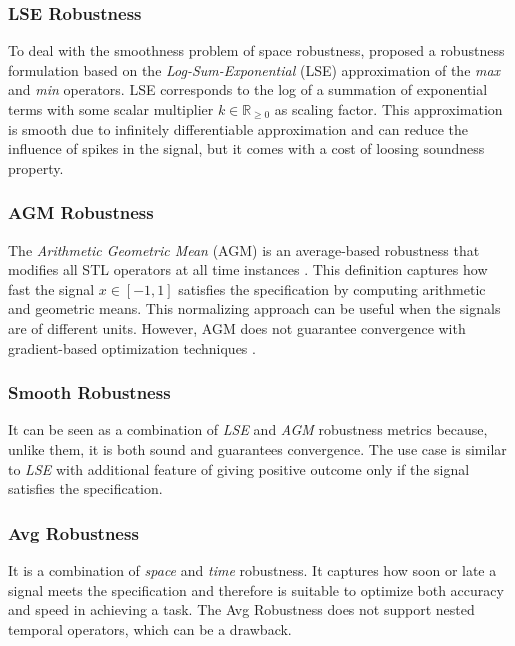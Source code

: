 \documentclass[conference]{IEEEtran}
\begin{document}
\subsubsection{LSE Robustness} \label{Sec: LSE}
To deal with the smoothness problem of space robustness, \cite{pant2017smooth} proposed a robustness formulation based on the \emph{Log-Sum-Exponential} (LSE) approximation of the \emph{max} and \emph{min} operators.
LSE corresponds to the log of a summation of exponential terms with some scalar multiplier $k \in \mathbb{R}_{\geq 0}$ as scaling factor.
This approximation is smooth due to infinitely differentiable approximation and can reduce the influence of spikes in the signal, but it comes with a cost of loosing soundness property. 

\subsubsection{AGM Robustness} \label{Sec: AGM}
The \emph{Arithmetic Geometric Mean} (AGM) is an average-based robustness that modifies all STL operators at all time instances \cite{mehdipour2019arithmetic}. 
This definition captures how fast the signal $x \in [-1,1]$ satisfies the specification by computing arithmetic and geometric means.
This normalizing approach can be useful when the signals are of different units.
However, AGM does not guarantee convergence with gradient-based optimization techniques \cite{gilpin2020smooth}.

\subsubsection{Smooth Robustness}
It can be seen as a combination of \emph{LSE} and \emph{AGM} robustness metrics \cite{gilpin2020smooth} because, unlike them, it is both sound and guarantees convergence.
The use case is similar to \emph{LSE} with additional feature of giving positive outcome only if the signal satisfies the specification.

\subsubsection{Avg Robustness}
It is a combination of \emph{space} and \emph{time} robustness.
It captures how soon or late a signal meets the specification \cite{aksaray2016q} and therefore is suitable to optimize both accuracy and speed in achieving a task.
The Avg Robustness does not support nested temporal operators, which can be a drawback. 
\end{document}
